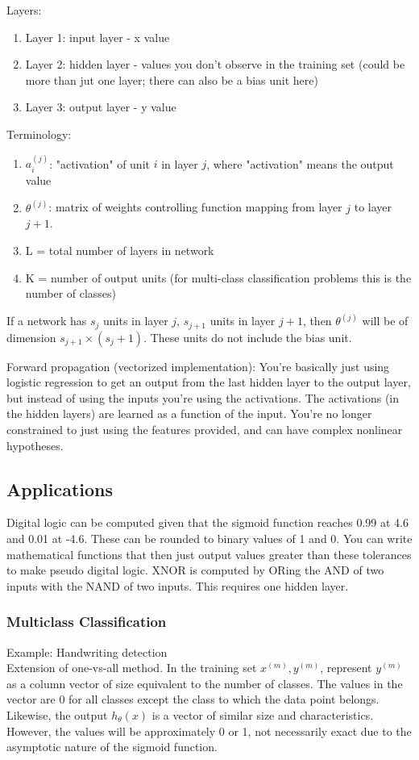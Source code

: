 \documentclass[11pt,letterpaper]{article}
\begin{document}
Layers:
\begin{enumerate}
	\item Layer 1: input layer - x value
	\item Layer 2: hidden layer - values you don't observe in the training set (could be more than jut one layer; there can also be a bias unit here)
	\item Layer 3: output layer - y value
\end{enumerate}

Terminology:
\begin{enumerate}
	\item $a_i^{(j)}$: "activation" of unit $i$ in layer $j$, where "activation" means the output value
	\item $\theta^{(j)}$: matrix of weights controlling function mapping from layer $j$ to layer $j+1$.
	\item L = total number of layers in network
	\item K = number of output units (for multi-class classification problems this is the number of classes)
\end{enumerate}

If a network has $s_j$ units in layer $j$, $s_{j+1}$ units in layer $j+1$, then $\theta^{(j)}$ will be of dimension $s_{j+1} \times (s_j + 1).$ These units do not include the bias unit.

Forward propagation (vectorized implementation): You're basically just using logistic regression to get an output from the last hidden layer to the output layer, but instead of using the inputs you're using the activations. The activations (in the hidden layers) are learned as a function of the input. You're no longer constrained to just using the features provided, and can have complex nonlinear hypotheses.

\subsection{Applications}
Digital logic can be computed given that the sigmoid function reaches 0.99 at 4.6 and 0.01 at -4.6. These can be rounded to binary values of 1 and 0. You can write mathematical functions that then just output values greater than these tolerances to make pseudo digital logic. XNOR is computed by ORing the AND of two inputs with the NAND of two inputs. This requires one hidden layer.

\subsubsection{Multiclass Classification}
Example: Handwriting detection\\
Extension of one-vs-all method. In the training set $x^{(m)}, y^{(m)}$, represent $y^{(m)}$ as a column vector of size equivalent to the number of classes. The values in the vector are 0 for all classes except the class to which the data point belongs. Likewise, the output $h_\theta (x)$ is a vector of similar size and characteristics. However, the values will be approximately 0 or 1, not necessarily exact due to the asymptotic nature of the sigmoid function.
\end{document}
